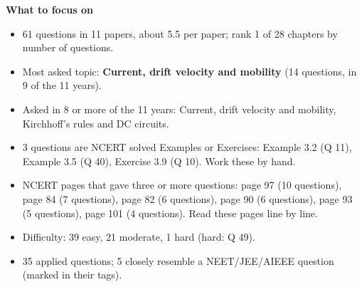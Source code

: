 \begin{minipage}[t]{0.63\linewidth}{\small\textbf{\color{crimson}What to focus on}\par\smallskip
\begin{itemize}[leftmargin=1.1em,itemsep=1pt,topsep=0pt]
\item 61 questions in 11 papers, about 5.5 per paper; rank 1 of 28 chapters by number of questions.
\item Most asked topic: \textbf{Current, drift velocity and mobility} (14 questions, in 9 of the 11 years).
\item Asked in 8 or more of the 11 years: Current, drift velocity and mobility, Kirchhoff's rules and DC circuits.
\item 3 questions are NCERT solved Examples or Exercises: Example 3.2 (Q 11), Example 3.5 (Q 40), Exercise 3.9 (Q 10). Work these by hand.
\item NCERT pages that gave three or more questions: page 97 (10 questions), page 84 (7 questions), page 82 (6 questions), page 90 (6 questions), page 93 (5 questions), page 101 (4 questions). Read these pages line by line.
\item Difficulty: 39 easy, 21 moderate, 1 hard (hard: Q 49).
\item 35 applied questions; 5 closely resemble a NEET/JEE/AIEEE question (marked in their tags).
\end{itemize}}\end{minipage}\par
{}
